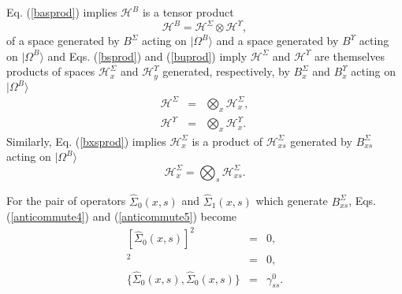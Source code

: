 \documentclass[twocolumn,amsmath,amssymb]{revtex4-1}
\begin{document}
Eq. (\ref{basprod}) implies
$\mathcal{H}^B$ is a tensor product
\begin{equation}
  \label{hprod}
  \mathcal{H}^B = \mathcal{H}^\Sigma \otimes \mathcal{H}^\Upsilon,
\end{equation}
of a space generated by $B^\Sigma$ acting on $|\Omega^B \rangle $ and a
space generated by $B^\Upsilon$ acting on $|\Omega^B \rangle $ and
Eqs. (\ref{bsprod}) and (\ref{buprod}) imply
$\mathcal{H}^\Sigma$ and $\mathcal{H}^\Upsilon$ are themselves
products of spaces $\mathcal{H}^\Sigma_x$ and $\mathcal{H}^\Upsilon_y$
generated, respectively, by $B^\Sigma_x$ and $B^\Upsilon_x$
acting on $|\Omega^B \rangle $
\begin{subequations}
\begin{eqnarray}
    \label{hsprod}
    \mathcal{H}^\Sigma &=&  \bigotimes_x \mathcal{H}^\Sigma_x, \\
    \label{huprod}
    \mathcal{H}^\Upsilon &=&  \bigotimes_x \mathcal{H}^\Upsilon_x.
\end{eqnarray}
\end{subequations}
Similarly, Eq. (\ref{bxsprod}) implies $\mathcal{H}^\Sigma_x$ is
a product of $\mathcal{H}^\Sigma_{xs}$
generated by $B^\Sigma_{xs}$ acting on $|\Omega^B \rangle $
\begin{equation}
    \label{hsxprod}
    \mathcal{H}^\Sigma_x =  \bigotimes_s \mathcal{H}^\Sigma_{xs}.
\end{equation}

For the pair of operators $\hat{\Sigma}_0(x,s)$
and $\hat{\Sigma}_1(x,s)$ which generate $B^\Sigma_{xs}$,
Eqs. (\ref{anticommute4}) and (\ref{anticommute5}) become
\begin{subequations}
  \begin{eqnarray}
    \label{sigmaeq0}
          [\hat{\Sigma}_0( x, s)] ^ 2 & = & 0, \\
    \label{sigmaeq1}
          [\hat{\Sigma}_1( x, s)] ^ 2 & = & 0, \\
    \label{sigmaeq01}
    \{\hat{\Sigma}_0( x, s), \hat{\Sigma}_0( x, s)\} & = & \gamma^0_{ss}.
  \end{eqnarray}
\end{subequations}
\end{document}
